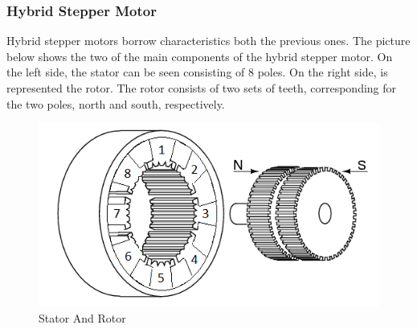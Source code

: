 \begin{figure}[htp]
    \centering
    \hfill
    \hfill
  	\hfill
\end{figure}

\subsubsection{Hybrid Stepper Motor}
Hybrid stepper motors borrow characteristics both the previous ones. The picture below shows the two of the main components of the hybrid stepper motor. On the left side, the stator can be seen consisting of 8 poles. On the right side, is represented the rotor. The rotor consists of two sets of teeth, corresponding for the two poles, north and south, respectively.

\begin{figure}[h]
	\centering
	\includegraphics[width=\textwidth]{figures/move/motor27.png}
	\caption{Stator And Rotor}
\end{figure}


